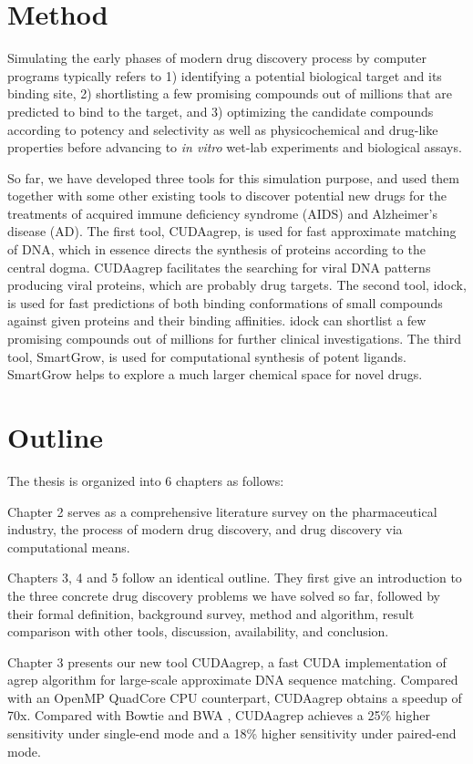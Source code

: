 \section{Method}

Simulating the early phases of modern drug discovery process by computer programs typically refers to 1) identifying a potential biological target and its binding site, 2) shortlisting a few promising compounds out of millions that are predicted to bind to the target, and 3) optimizing the candidate compounds according to potency and selectivity as well as physicochemical and drug-like properties before advancing to \textit{in vitro} wet-lab experiments and biological assays.

So far, we have developed three tools for this simulation purpose, and used them together with some other existing tools to discover potential new drugs for the treatments of acquired immune deficiency syndrome (AIDS) and Alzheimer's disease (AD). The first tool, CUDAagrep, is used for fast approximate matching of DNA, which in essence directs the synthesis of proteins according to the central dogma. CUDAagrep facilitates the searching for viral DNA patterns producing viral proteins, which are probably drug targets. The second tool, idock, is used for fast predictions of both binding conformations of small compounds against given proteins and their binding affinities. idock can shortlist a few promising compounds out of millions for further clinical investigations. The third tool, SmartGrow, is used for computational synthesis of potent ligands. SmartGrow helps to explore a much larger chemical space for novel drugs.

\section{Outline}

The thesis is organized into 6 chapters as follows:

Chapter 2 serves as a comprehensive literature survey on the pharmaceutical industry, the process of modern drug discovery, and drug discovery via computational means.

Chapters 3, 4 and 5 follow an identical outline. They first give an introduction to the three concrete drug discovery problems we have solved so far, followed by their formal definition, background survey, method and algorithm, result comparison with other tools, discussion, availability, and conclusion.

Chapter 3 presents our new tool CUDAagrep, a fast CUDA implementation of agrep algorithm for large-scale approximate DNA sequence matching. Compared with an OpenMP QuadCore CPU counterpart, CUDAagrep obtains a speedup of 70x. Compared with Bowtie \citep{450-2009} and BWA \citep{251-2009}, CUDAagrep achieves a 25\% higher sensitivity under single-end mode and a 18\% higher sensitivity under paired-end mode.

